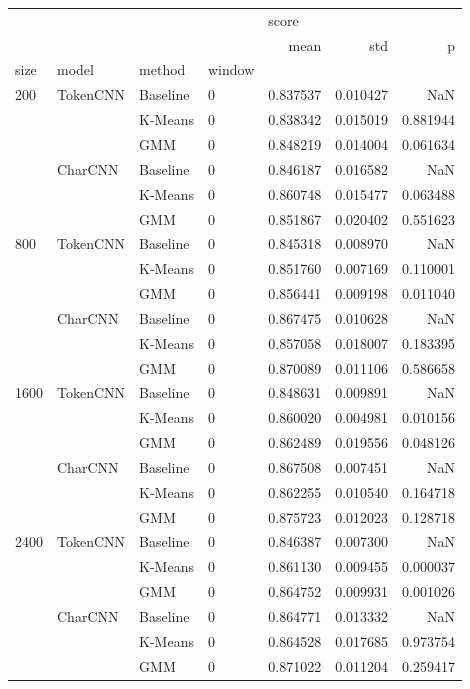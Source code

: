 \begin{tabular}{llllrrr}
\toprule
     &         &     &   & \multicolumn{3}{l}{score} \\
     &         &     &   &      mean &       std &         p \\
size & model & method & window &           &           &           \\
\midrule
200  & TokenCNN & Baseline & 0 &  0.837537 &  0.010427 &       NaN \\
     &         & K-Means & 0 &  0.838342 &  0.015019 &  0.881944 \\
     &         & GMM & 0 &  0.848219 &  0.014004 &  0.061634 \\
     & CharCNN & Baseline & 0 &  0.846187 &  0.016582 &       NaN \\
     &         & K-Means & 0 &  0.860748 &  0.015477 &  0.063488 \\
     &         & GMM & 0 &  0.851867 &  0.020402 &  0.551623 \\
800  & TokenCNN & Baseline & 0 &  0.845318 &  0.008970 &       NaN \\
     &         & K-Means & 0 &  0.851760 &  0.007169 &  0.110001 \\
     &         & GMM & 0 &  0.856441 &  0.009198 &  0.011040 \\
     & CharCNN & Baseline & 0 &  0.867475 &  0.010628 &       NaN \\
     &         & K-Means & 0 &  0.857058 &  0.018007 &  0.183395 \\
     &         & GMM & 0 &  0.870089 &  0.011106 &  0.586658 \\
1600 & TokenCNN & Baseline & 0 &  0.848631 &  0.009891 &       NaN \\
     &         & K-Means & 0 &  0.860020 &  0.004981 &  0.010156 \\
     &         & GMM & 0 &  0.862489 &  0.019556 &  0.048126 \\
     & CharCNN & Baseline & 0 &  0.867508 &  0.007451 &       NaN \\
     &         & K-Means & 0 &  0.862255 &  0.010540 &  0.164718 \\
     &         & GMM & 0 &  0.875723 &  0.012023 &  0.128718 \\
2400 & TokenCNN & Baseline & 0 &  0.846387 &  0.007300 &       NaN \\
     &         & K-Means & 0 &  0.861130 &  0.009455 &  0.000037 \\
     &         & GMM & 0 &  0.864752 &  0.009931 &  0.001026 \\
     & CharCNN & Baseline & 0 &  0.864771 &  0.013332 &       NaN \\
     &         & K-Means & 0 &  0.864528 &  0.017685 &  0.973754 \\
     &         & GMM & 0 &  0.871022 &  0.011204 &  0.259417 \\
\bottomrule
\end{tabular}
